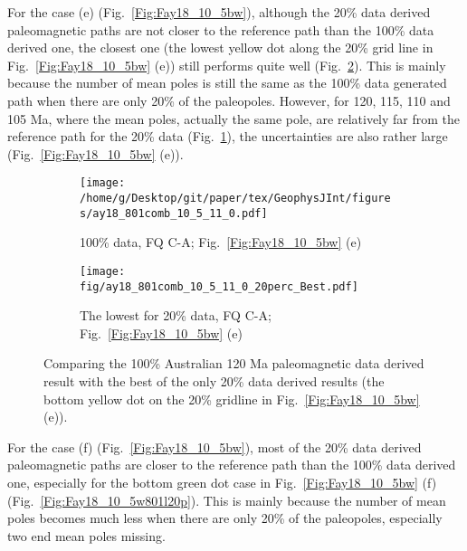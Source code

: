For the case (e) (Fig.~\ref{Fig:Fay18_10_5bw}), although the 20\% data derived
paleomagnetic paths are not closer to the reference path than the 100\% data
derived one, the closest one (the lowest yellow dot along the 20\% grid line in
Fig.~\ref{Fig:Fay18_10_5bw} (e)) still performs quite well
(Fig.~\ref{Fig:Fay18_10_5b801l20p}). This is mainly because the number of mean
poles is still the same as the 100\% data generated path when there are only
20\% of the paleopoles. However, for 120, 115, 110 and 105 Ma, where the mean
poles, actually the same pole, are relatively far from the reference path for
the 20\% data (Fig.~\ref{Fig:Fay18_10_5b801}), the uncertainties are also
rather large (Fig.~\ref{Fig:Fay18_10_5bw} (e)).

\begin{figure*}[tbp]
  \captionsetup[subfigure]{labelformat=empty,aboveskip=-6pt,belowskip=-6pt}
  \centering
  \begin{subfigure}[htbp]{.49\textwidth}
    \captionsetup{skip=0pt}
    \centering
    \texttt{[image: /home/g/Desktop/git/paper/tex/GeophysJInt/figures/ay18\_801comb\_10\_5\_11\_0.pdf]}
	\caption{100\% data, FQ C-A; Fig.~\ref{Fig:Fay18_10_5bw}
	(e)}\label{Fig:Fay18_10_5b801}
  \end{subfigure}
  \begin{subfigure}[htbp]{.49\textwidth}
    \captionsetup{skip=0pt}
    \centering
    \texttt{[image: fig/ay18\_801comb\_10\_5\_11\_0\_20perc\_Best.pdf]} %
    \caption{The lowest for 20\% data, FQ C-A;
	Fig.~\ref{Fig:Fay18_10_5bw} (e)}\label{Fig:Fay18_10_5b801l20p}
  \end{subfigure}
  \caption[Less data, better similarity?]{Comparing the 100\% Australian
  120 Ma paleomagnetic data derived result with the best of the only
  20\% data derived results (the bottom yellow dot on the 20\% gridline in
  Fig.~\ref{Fig:Fay18_10_5bw}
  (e)).}\label{Fig:Fay18_10_5b801l20p_vs_100p}
\end{figure*}

For the case (f) (Fig.~\ref{Fig:Fay18_10_5bw}), most of the 20\% data derived
paleomagnetic paths are closer to the reference path than the 100\% data derived
one, especially for the bottom green dot case in Fig.~\ref{Fig:Fay18_10_5bw} (f)
(Fig.~\ref{Fig:Fay18_10_5w801l20p}). This is mainly because the number of mean
poles becomes much less when there are only 20\% of the paleopoles, especially
two end mean poles missing.


